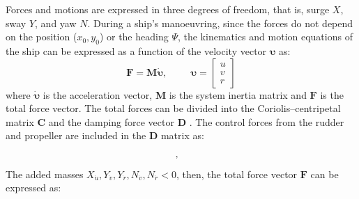 Forces and motions are expressed in three degrees of freedom, that is, surge $X$, sway $Y$, and yaw $N$. During a ship's manoeuvring, since the forces do not depend on the position ($x_0,y_0$) or the heading $\Psi$, the kinematics and motion equations of the ship can be expressed as a function of the velocity vector $\pmb{\bm{\upsilon}}$ as:
\begin{equation}
    \label{eq:eom}
    \mathbf{F} = \mathbf{M}  \pmb{\bm{\dot{\upsilon}}}, \hspace{1cm}
    \pmb{\bm{\upsilon}} = \left[\begin{matrix}u\\v\\r\end{matrix}\right]
\end{equation}
where $\pmb{\bm{\dot{\upsilon}}}$ is the acceleration vector, $\mathbf{M}$ is the system inertia matrix and $\mathbf{F}$ is the total force vector.
The total forces can be divided into the Coriolis–centripetal matrix $\mathbf{C}$ and the damping force vector $\mathbf{D}$ \citep{fossenHandbookMarineCraft2011}. The control forces from the rudder and propeller are included in the $\mathbf{D}$ matrix as:
\begin{equation}
    \label{eq:C_expanded}
    , \hspace{0.3cm}
    
\end{equation}
%     
The added masses  $X_{\dot{u}},Y_{\dot{v}},Y_{\dot{r}},N_{\dot{v}},N_{\dot{r}} < 0$, then, the total force vector $\mathbf{F}$ can be expressed as:
